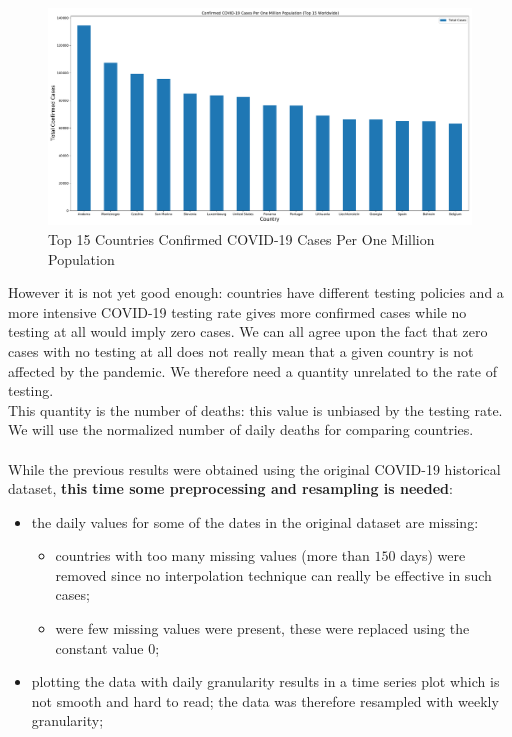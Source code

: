 \documentclass[11pt,a4paper]{article}
\begin{document}
\begin{figure}[H]
    \begin{center}
        \hspace*{-0.2cm}
        \includegraphics[scale=0.32]{img/total-cases-per-million.pdf}
    \end{center}
    \caption{Top 15 Countries Confirmed COVID-19 Cases Per One Million Population}
\end{figure}
\noindent However it is not yet good enough: countries have different testing
policies and a more intensive COVID-19 testing rate gives more confirmed cases
while no testing at all would imply zero cases. We can all agree upon the fact
that zero cases with no testing at all does not really mean that a given country
is not affected by the pandemic. We therefore need a quantity unrelated to the
rate of testing.\\
This quantity is the number of deaths: this value is unbiased by the testing
rate. We will use the normalized number of daily deaths for comparing
countries.\\
\\
While the previous results were obtained using the original COVID-19 historical
dataset\cite{ourworldindata}, \textbf{this time some preprocessing and
resampling is needed}:
\begin{itemize}
    \item the daily values for some of the dates in the original dataset are missing:
    \begin{itemize}
        \item countries with too many missing values (more than $150$ days) were
        removed since no interpolation technique can really be effective in such
        cases;
        \item were few missing values were present, these were replaced using
        the constant value $0$;
    \end{itemize}
    \item plotting the data with daily granularity results in a time series plot
    which is not smooth and hard to read; the data was therefore resampled with
    weekly granularity;
\end{itemize}
\end{document}
